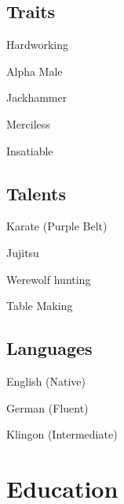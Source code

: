 \documentclass[11pt,a4paper]{resume}
\begin{document}
\makeheader

\begin{skills}
  \subsection{Traits}
  \begin{programming}
  \item Hardworking
  \item Alpha Male
  \item Jackhammer
  \item Merciless
  \item Insatiable
  \end{programming}
  \subsection{Talents}
  \begin{programming}
  \item Karate (Purple Belt)
  \item Jujitsu
  \item Werewolf hunting
  \item Table Making
  \end{programming}
  \subsection{Languages}
  \begin{languages}
  \item English (Native)
  \item German (Fluent)
  \item Klingon (Intermediate)
  \end{languages}
\end{skills}

\section{Education}
\begin{education}
\end{education}
\end{document}
